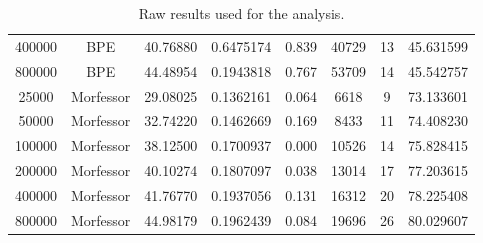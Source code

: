 \documentclass[11pt]{article}
\begin{document}
\begin{sidewaystable}
\begin{tabular}{|c|c|c|c|c|c|c|c|}
400000        & BPE          & 40.76880  & 0.6475174 & 0.839 & 40729       & 13          & 45.631599        \\
800000        & BPE          & 44.48954  & 0.1943818 & 0.767 & 53709       & 14          & 45.542757        \\
25000         & Morfessor    & 29.08025  & 0.1362161 & 0.064 & 6618        & 9           & 73.133601        \\
50000         & Morfessor    & 32.74220  & 0.1462669 & 0.169 & 8433        & 11          & 74.408230        \\
100000        & Morfessor    & 38.12500  & 0.1700937 & 0.000 & 10526       & 14          & 75.828415        \\
200000        & Morfessor    & 40.10274  & 0.1807097 & 0.038 & 13014       & 17          & 77.203615        \\
400000        & Morfessor    & 41.76770  & 0.1937056 & 0.131 & 16312       & 20          & 78.225408        \\
800000        & Morfessor    & 44.98179  & 0.1962439 & 0.084 & 19696       & 26          & 80.029607        \\ \hline
\end{tabular}
\label{tab:raw}
\caption{Raw results used for the analysis.}
\end{sidewaystable}
\end{document}
